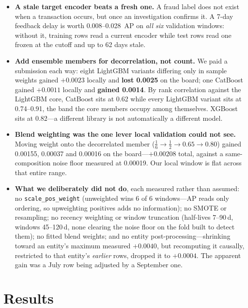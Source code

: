 \documentclass[10pt,a4paper]{article}
\begin{document}
\begin{itemize}
\item \textbf{A stale target encoder beats a fresh one.} A fraud label does not
exist when a transaction occurs, but once an investigation confirms it. A 7-day
feedback delay is worth 0.008--0.028~AP on \emph{all six} validation windows:
without it, training rows read a current encoder while test rows read one frozen
at the cutoff and up to 62 days stale.

\item \textbf{Add ensemble members for decorrelation, not count.} We paid a
submission each way: eight LightGBM variants differing only in sample weights
gained $+0.0023$ locally and \textbf{lost 0.0025} on the board; one CatBoost
gained $+0.0011$ locally and \textbf{gained 0.0014}. By rank correlation against
the LightGBM core, CatBoost sits at 0.62 while every LightGBM variant sits at
0.74--0.91, the band the core members occupy among themselves. XGBoost sits at
0.82---a different library is not automatically a different model.

\item \textbf{Blend weighting was the one lever local validation could not see.}
Moving weight onto the decorrelated member ($\tfrac16 \rightarrow \tfrac12
\rightarrow 0.65 \rightarrow 0.80$) gained 0.00155, 0.00037 and 0.00016 on the
board---$+0.00208$ total, against a same-composition noise floor measured at
0.00019. Our local window is flat across that entire range.

\item \textbf{What we deliberately did not do}, each measured rather than
assumed: no \texttt{scale\_pos\_weight} (unweighted wins 6 of 6 windows---AP
reads only ordering, so upweighting positives adds no information); no SMOTE or
resampling; no recency weighting or window truncation (half-lives 7--90\,d,
windows 45--120\,d, none clearing the noise floor on the fold built to detect
them); no fitted blend weights; and no entity post-processing---shrinking toward
an entity's maximum measured $+0.0040$, but recomputing it causally, restricted
to that entity's \emph{earlier} rows, dropped it to $+0.0004$. The apparent gain
was a July row being adjusted by a September one.
\end{itemize}

\section{Results}
\end{document}
